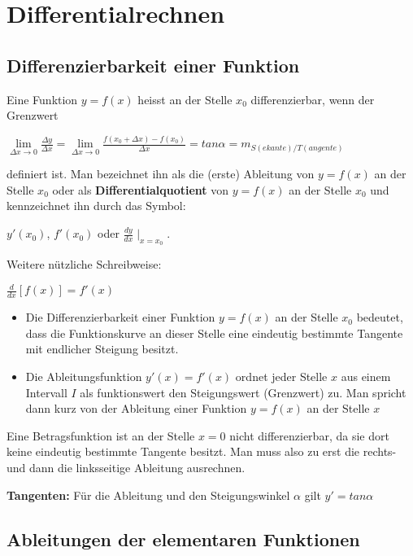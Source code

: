 \chapter{Differentialrechnen}
\section{Differenzierbarkeit einer Funktion}
Eine Funktion \(y=f(x)\) heisst an der Stelle \(x_0\) differenzierbar, wenn der Grenzwert

\( \lim\limits_{\Delta x \rightarrow 0}{\frac{\Delta y}{\Delta x}} = \lim\limits_{\Delta x \rightarrow 0}{\frac{f(x_0 + \Delta x)-f(x_0)}{\Delta x}} = tan \alpha = m_{S(ekante)/T(angente)} \)

definiert ist. Man bezeichnet ihn als die (erste) Ableitung von \(y=f(x)\) an der Stelle \(x_0\) oder als \textbf{Differentialquotient} von \(y=f(x)\) an der Stelle \(x_0\) und kennzeichnet ihn durch das Symbol:

 \hspace*{10mm}\(y'(x_0)\), \(f'(x_0)\) oder \(\frac{dy}{dx} \mid_{x=x_0}\).

Weitere nützliche Schreibweise:

\hspace*{10mm}\(\frac{d}{dx}[f(x)] = f'(x)\)

\begin{itemize}
	\item Die Differenzierbarkeit einer Funktion \(y=f(x)\) an der Stelle \(x_0\) bedeutet, dass die Funktionskurve an dieser Stelle eine eindeutig bestimmte Tangente mit endlicher Steigung besitzt.
	\item Die Ableitungsfunktion \(y'(x)=f'(x)\) ordnet jeder Stelle \(x\) aus einem Intervall \(I\) als funktionswert den Steigungswert (Grenzwert) zu. Man spricht dann kurz von der Ableitung einer Funktion \(y=f(x)\) an der Stelle \(x\)
\end{itemize}
Eine Betragsfunktion ist an der Stelle \(x=0\) nicht differenzierbar, da sie dort keine eindeutig bestimmte Tangente besitzt. Man muss also zu erst die rechts- und dann die linksseitige Ableitung ausrechnen.
\par \textbf{Tangenten:} Für die Ableitung und den Steigungswinkel \(\alpha\) gilt \(y'=tan \alpha\)

\section{Ableitungen der elementaren Funktionen}

